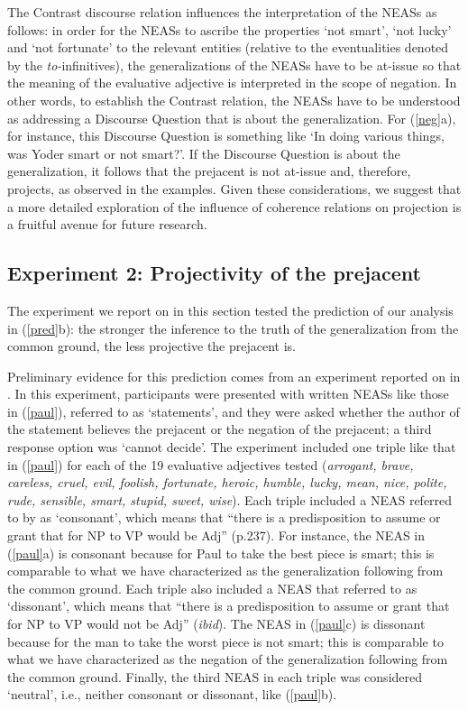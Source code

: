 \documentclass[11pt,fleqn]{article}
\newcommand{\6}{\mbox{$[\hspace*{-.6mm}[$}}
\newcommand{\9}{\mbox{$]\hspace*{-.6mm}]$}}
\begin{document}
The Contrast discourse relation influences the interpretation of the NEASs as follows: in order for the NEASs to ascribe the properties `not smart', `not lucky' and `not fortunate' to the relevant entities (relative to the eventualities denoted by the {\em to-}infinitives), the generalizations of the NEASs have to be at-issue so that the meaning of the evaluative adjective is interpreted in the scope of negation. In other words, to establish the Contrast relation, the NEASs have to be understood as addressing a Discourse Question that is about the generalization. For (\ref{neg}a), for instance, this Discourse Question is something like `In doing various things, was Yoder smart or not smart?'. If the Discourse Question is about the generalization, it follows that the prejacent is not at-issue and, therefore, projects, as observed in the examples. Given these considerations, we suggest that a more detailed exploration of the influence of coherence relations on projection is a fruitful avenue for future research. 

\subsection{Experiment 2: Projectivity of the prejacent}\label{s42}

The experiment we report on in this section tested the prediction of our analysis in (\ref{pred}b): the stronger the inference to the truth of the generalization from the common ground, the less projective the prejacent is.

Preliminary evidence for this prediction comes from an experiment reported on in \citealt{karttunen-etal2014}. In this experiment, participants were presented with written NEASs like those in (\ref{paul}), referred to as `statements', and they were asked whether the author of the statement believes  the prejacent or the negation of the prejacent; a third response option was `cannot decide'. The experiment included one triple like that in (\ref{paul}) for each of the 19 evaluative adjectives tested ({\em arrogant, brave, careless, cruel, evil,
foolish, fortunate, heroic, humble, lucky, mean, nice, polite, rude,
sensible, smart, stupid, sweet, wise}). Each triple included a NEAS referred to by \citet{karttunen-etal2014} as `consonant', which means that ``there is a predisposition to assume or grant that for NP to VP would be Adj'' (p.237). For instance, the NEAS in (\ref{paul}a) is consonant because for Paul to take the best piece is smart; this is comparable to what we have characterized as the generalization following from the common ground. Each triple also included a NEAS that \citet{karttunen-etal2014} referred to as `dissonant', which means that ``there is a predisposition to assume or grant that for NP to VP would not be Adj'' ({\em ibid}). The NEAS in (\ref{paul}c) is dissonant because for the man to take the worst piece is not smart; this is comparable to what we have characterized as the negation of the generalization following from the common ground. Finally, the third NEAS in each triple was considered `neutral', i.e., neither consonant or dissonant, like (\ref{paul}b).
\end{document}
